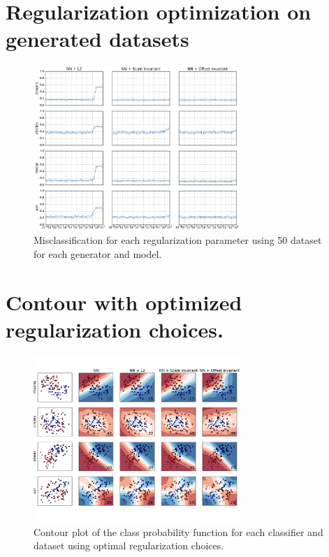 
\onecolumn
\section{Regularization optimization on generated datasets}
\label{appendix:regualization-optimization}
\begin{figure}[H]
	\centering
	\includegraphics[width=0.7\textwidth]{plots/syntetic_reg_opt}
	\caption{Misclassification for each regularization parameter using 50 dataset for each generator and model.}
\end{figure}

\section{Contour with optimized regularization choices.}
\label{appendix:generated-contour-optimized}
\begin{figure}[H]
	\centering
	\includegraphics[width=0.7\textwidth, trim = 0 2.2cm 0 1.5cm, clip]{plots/2d_classifier-optimized}
	\caption{Contour plot of the class probability function for each classifier and dataset using optimal regularization choices.}
\end{figure}


